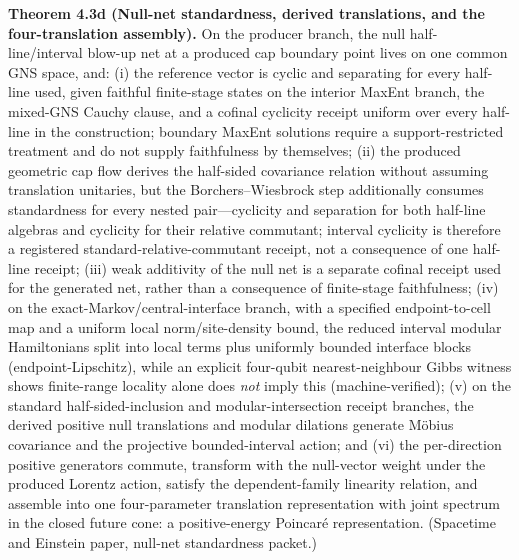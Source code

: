 \textbf{Theorem 4.3d (Null-net standardness, derived translations, and the four-translation assembly).} On the producer branch, the null half-line/interval blow-up net at a produced cap boundary point lives on one common GNS space, and: (i) the reference vector is cyclic and separating for every half-line used, given faithful finite-stage states on the interior MaxEnt branch, the mixed-GNS Cauchy clause, and a cofinal cyclicity receipt uniform over every half-line in the construction; boundary MaxEnt solutions require a support-restricted treatment and do not supply faithfulness by themselves; (ii) the produced geometric cap flow derives the half-sided covariance relation without assuming translation unitaries, but the Borchers--Wiesbrock step additionally consumes standardness for every nested pair---cyclicity and separation for both half-line algebras and cyclicity for their relative commutant; interval cyclicity is therefore a registered standard-relative-commutant receipt, not a consequence of one half-line receipt; (iii) weak additivity of the null net is a separate cofinal receipt used for the generated net, rather than a consequence of finite-stage faithfulness; (iv) on the exact-Markov/central-interface branch, with a specified endpoint-to-cell map and a uniform local norm/site-density bound, the reduced interval modular Hamiltonians split into local terms plus uniformly bounded interface blocks (endpoint-Lipschitz), while an explicit four-qubit nearest-neighbour Gibbs witness shows finite-range locality alone does \emph{not} imply this (machine-verified); (v) on the standard half-sided-inclusion and modular-intersection receipt branches, the derived positive null translations and modular dilations generate M\"obius covariance and the projective bounded-interval action; and (vi) the per-direction positive generators commute, transform with the null-vector weight under the produced Lorentz action, satisfy the dependent-family linearity relation, and assemble into one four-parameter translation representation with joint spectrum in the closed future cone: a positive-energy Poincar\'e representation. (Spacetime and Einstein paper, null-net standardness packet.)

